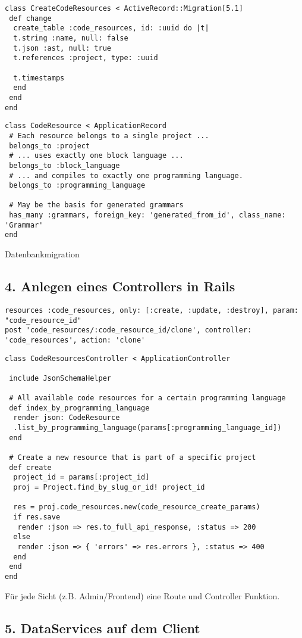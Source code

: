 \begin{lstlisting}
class CreateCodeResources < ActiveRecord::Migration[5.1]
 def change
  create_table :code_resources, id: :uuid do |t|
  t.string :name, null: false
  t.json :ast, null: true
  t.references :project, type: :uuid

  t.timestamps
  end
 end
end
\end{lstlisting}

\begin{lstlisting}
class CodeResource < ApplicationRecord
 # Each resource belongs to a single project ...
 belongs_to :project
 # ... uses exactly one block language ...
 belongs_to :block_language
 # ... and compiles to exactly one programming language.
 belongs_to :programming_language

 # May be the basis for generated grammars
 has_many :grammars, foreign_key: 'generated_from_id', class_name: 'Grammar'
end
\end{lstlisting}
Datenbankmigration
\subsection{4. Anlegen eines Controllers in Rails}
\begin{lstlisting}
resources :code_resources, only: [:create, :update, :destroy], param: "code_resource_id"
post 'code_resources/:code_resource_id/clone', controller:  'code_resources', action: 'clone'
\end{lstlisting}
\begin{lstlisting}
class CodeResourcesController < ApplicationController

 include JsonSchemaHelper

 # All available code resources for a certain programming language
 def index_by_programming_language
  render json: CodeResource
  .list_by_programming_language(params[:programming_language_id])
 end

 # Create a new resource that is part of a specific project
 def create
  project_id = params[:project_id]
  proj = Project.find_by_slug_or_id! project_id

  res = proj.code_resources.new(code_resource_create_params)
  if res.save
   render :json => res.to_full_api_response, :status => 200
  else
   render :json => { 'errors' => res.errors }, :status => 400
  end
 end
end
 \end{lstlisting}
Für jede Sicht (z.B. Admin/Frontend) eine Route und Controller Funktion.
\subsection{5. DataServices auf dem Client}
